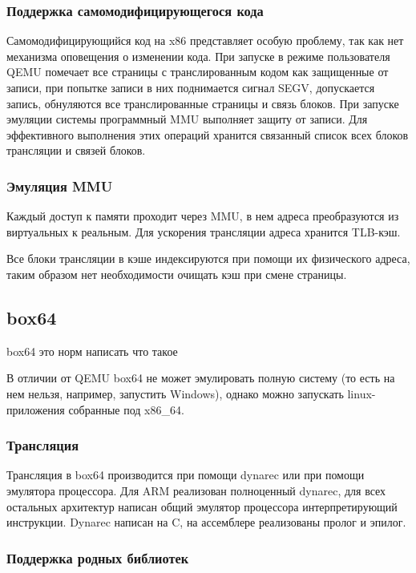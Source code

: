 \subsubsection{Поддержка самомодифицирующегося кода}

Самомодифицирующийся код на x86 представляет особую проблему, так как нет механизма оповещения о изменении кода. При запуске в режиме пользователя QEMU помечает все страницы с транслированным кодом как защищенные от записи, при попытке записи в них поднимается сигнал SEGV, допускается запись, обнуляются все транслированные страницы и связь блоков. При запуске эмуляции системы программный MMU выполняет защиту от записи.
Для эффективного выполнения этих операций хранится связанный список всех блоков трансляции и связей блоков.

\subsubsection{Эмуляция MMU}

Каждый доступ к памяти проходит через MMU, в нем адреса преобразуются из виртуальных к реальным. Для ускорения трансляции адреса хранится TLB-кэш.

Все блоки трансляции в кэше индексируются при помощи их физического адреса, таким образом нет необходимости очищать кэш при смене страницы.

\subsection{box64}

box64 это норм написать что такое

В отличии от QEMU box64 не может эмулировать полную систему (то есть на нем нельзя, например, запустить Windows), однако можно запускать linux-приложения собранные под x86\_64.

\subsubsection{Трансляция}

Трансляция в box64 производится при помощи dynarec или при помощи эмулятора процессора. Для ARM реализован полноценный dynarec, для всех остальных архитектур написан общий эмулятор процессора интерпретирующий инструкции. Dynarec написан на C, на ассемблере реализованы пролог и эпилог.

\subsubsection{Поддержка родных библиотек}

